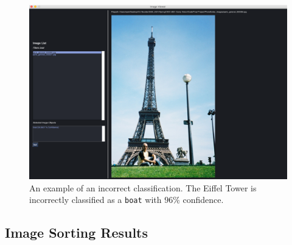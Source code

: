 \documentclass[12pt]{article}
\begin{document}
\begin{figure}[H]
	\centering
	\includegraphics[width=.9\textwidth]{images/incorrect_classification_boat.png}
	\caption{An example of an incorrect classification. The Eiffel Tower is incorrectly classified as a \texttt{boat} with $96\%$ confidence.}
	\label{fig:incorrect_classification}
\end{figure}

\subsection{Image Sorting Results}
\end{document}
